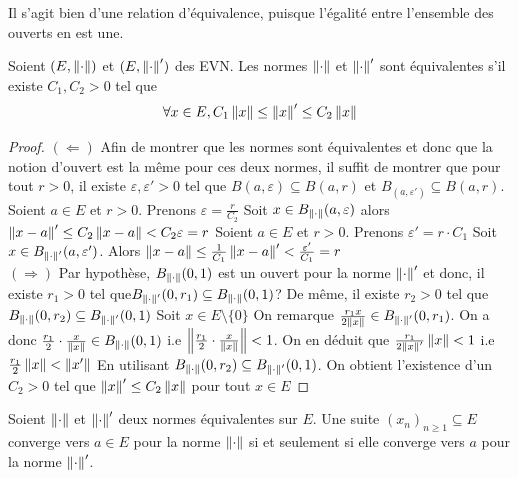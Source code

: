 \begin{remarque}
Il s'agit bien d'une relation d'équivalence, puisque l'égalité entre l'ensemble des ouverts en est une.
\end{remarque}
\begin{proposition}
    Soient $(E,\left\| \cdot \right\|)$ et $(E,\left\| \cdot \right\|')$ des EVN. Les normes $\left\| \cdot \right\|$ et $\left\| \cdot \right\|'$ sont équivalentes s'il existe $C_1,C_2>0$ tel que
    \[
    \forall x\in E, C_1\left\| x \right\|\leq \left\| x \right\|'\leq  C_2\left\| x \right\|
    \]
\end{proposition}
\begin{proof}
    $(\Leftarrow)$ Afin de montrer que les normes sont équivalentes et donc que la notion d'ouvert est la même pour ces deux normes, il suffit de montrer que pour tout $r>0$, il existe $\varepsilon,\varepsilon '>0$ tel que $B(a,\varepsilon)\subseteq B(a,r)$ et $B_(a,\varepsilon')\subseteq B(a,r)$. Soient $a\in E$ et $r>0$. Prenons $\varepsilon =\frac{r}{C_2}$ Soit $x\in B_{\left\| \cdot \right\|}(a,\varepsilon)$ alors $\left\| x-a \right\|'\leq C_2\left\| x-a \right\|<C_2\varepsilon=r$ Soient $a\in E$ et $r>0$. Prenons $\varepsilon'=r\cdot C_1$
    Soit $x\in B_{\left\| \cdot \right\|'}(a,\varepsilon')$. Alors $\left\| x-a \right\|\leq \frac{1}{C_1}\left\| x-a \right\|'<\frac{\varepsilon'}{C_1}=r$\\
    $(\Rightarrow)$ Par hypothèse, $B_{\left\| \cdot \right\|}(0,1)$ est un ouvert pour la norme $\left\| \cdot \right\|'$ et donc, il existe $r_1>0$ tel que$B_{\left\| \cdot \right\|'}(0,r_1)\subseteq B_{\left\| \cdot \right\|}(0,1)$? De même, il existe $r_2>0$ tel que$B_{\left\| \cdot \right\|}(0,r_2)\subseteq B_{\left\| \cdot \right\|'}(0,1)$ Soit $x\in E\setminus\{0\}$ On remarque $\frac{r_1x}{2\left\| x \right\|}\in B_{\left\| \cdot \right\|'}(0,r_1)$. On a donc $\frac{r_1}{2}\cdot\frac{x}{\left\| x \right\|}\in B_{\left\| \cdot \right\|}(0,1)$ i.e
    $\left\| \frac{r_1}{2}\cdot\frac{x}{\left\| x \right\|} \right\|<1$. On en déduit que $\frac{r_1}{2\left\| x \right\|'}\left\| x \right\|<1$ i.e $\frac{r_1}{2}\left\| x \right\|<\left\| x' \right\|$ En utilisant $B_{\left\| \cdot \right\|}(0,r_2)\subseteq B_{\left\| \cdot \right\|'}(0,1)$. On obtient l'existence d'un $C_2>0$ tel que $\left\| x \right\|'\leq C_2\left\| x \right\|$ pour tout $x\in E$
\end{proof}

\begin{remarque}[Exo]
    Soient $\left\| \cdot \right\|$ et $\left\| \cdot \right\|'$ deux normes équivalentes sur $E$.
    Une suite $(x_n)_{n\geq 1}\subseteq E$ converge vers $a\in E$ pour la norme $\left\| \cdot \right\|$ si et seulement si elle converge vers $a$ pour la norme $\left\| \cdot \right\|'$.
\end{remarque}

